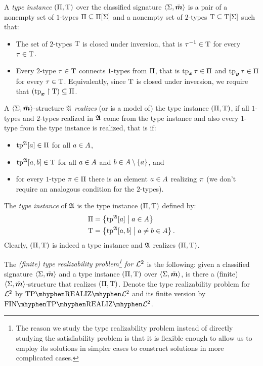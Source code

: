 \begin{definition}\label{def:tpinst-twovar}
A \emph{type instance} $(\Pi,\mathrm{T})$ over the classified
signature $\left\langle \mathrm{\Sigma},\bar{\bm{m}} \right\rangle$ is a pair of a nonempty set of $1$-types
$\Pi\subseteq\Pi[\mathrm{\Sigma}]$ and a nonempty set of $2$-types
$\mathrm{T}\subseteq\mathrm{T}[\mathrm{\Sigma}]$ such that:
\begin{itemize}
  \item The set of $2$-types $\mathrm{T}$ is closed under inversion, that is
  $\tau^{-1}\in\mathrm{T}$ for every $\tau\in\mathrm{T}$.
  \item Every $2$-type $\tau\in\mathrm{T}$ connects $1$-types from $\Pi$,
  that is $\operatorname{tp}_{\bm{x}}\tau\in\Pi$ and $\operatorname{tp}_{\bm{y}}\tau\in\Pi$ for every $\tau\in\mathrm{T}$.
  Equivalently, since $\mathrm{T}$ is closed under inversion, we require that
  $(\operatorname{tp}_{\bm{x}}\restriction\mathrm{T})\subseteq\Pi$.
\end{itemize}

A $\left\langle \mathrm{\Sigma},\bar{\bm{m}} \right\rangle$-structure $\mathfrak{A}$ \emph{realizes} (or is a model of) the
type instance $(\Pi,\mathrm{T})$, if all $1$-types and $2$-types realized in
$\mathfrak{A}$ come from the type instance and also every $1$-type from the type
instance is realized, that is if:
\begin{itemize}
  \item $\operatorname{tp}^{\mathfrak{A}}[a] \in \Pi$ for all $a\in A$,
  \item $\operatorname{tp}^{\mathfrak{A}}[a,b] \in \mathrm{T}$ for all $a\in A$ and
  $b \in A\setminus\left\{a\right\}$, and
  \item for every $1$-type $\pi \in \Pi$ there is an element $a \in A$
realizing $\pi$ (we don't require an analogous condition for the $2$-types).
\end{itemize}

The \emph{type instance} of $\mathfrak{A}$ is the type instance $(\Pi,\mathrm{T})$
defined by:
\begin{align*}
  \Pi &= \left\{\operatorname{tp}^{\mathfrak{A}}[a]\mathrel{}\middle|\mathrel{}a \in A\right\} \\
  \mathrm{T} &= \left\{\operatorname{tp}^{\mathfrak{A}}[a,b]\mathrel{}\middle|\mathrel{}a\neq b \in A\right\}.
\end{align*}
Clearly, $(\Pi,\mathrm{T})$ is indeed a type instance and $\mathfrak{A}$ realizes
$(\Pi,\mathrm{T})$.

The \emph{(finite) type realizability problem\footnote{The reason we study the
type realizability problem instead of directly studying the satisfiability
problem is that it is flexible enough to allow us to employ its solutions in simpler cases to construct solutions in more complicated cases.}
for $\mathcal{L}^{2}$} is the following:
given a classified signature $\left\langle \mathrm{\Sigma},\bar{\bm{m}} \right\rangle$ and a type instance
$(\Pi,\mathrm{T})$ over $\left\langle \mathrm{\Sigma},\bar{\bm{m}} \right\rangle$, is there a (finite)
$\left\langle \mathrm{\Sigma},\bar{\bm{m}} \right\rangle$-structure that realizes $(\Pi,\mathrm{T})$.
Denote the type realizability problem for $\mathcal{L}^{2}$ by
$\Real{\vFo2}$ and its finite version by $\FinReal{\vFo2}$.
\end{definition}

